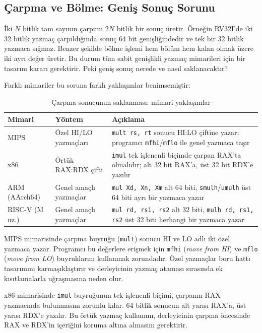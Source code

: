 \subsection{Çarpma ve Bölme: Geniş Sonuç Sorunu}
\label{sec:carpma-bolme-sorunu}

İki $N$ bitlik tam sayının çarpımı $2N$ bitlik bir sonuç üretir. Örneğin RV32I'de iki 32 bitlik yazmaç çarpıldığında sonuç 64 bit genişliğindedir ve tek bir 32 bitlik yazmaca sığmaz. Benzer şekilde bölme işlemi hem bölüm hem kalan olmak üzere iki ayrı değer üretir. Bu durum tüm sabit genişlikli yazmaç mimarileri için bir tasarım kararı gerektirir. Peki geniş sonuç nerede ve nasıl saklanacaktır?

Farklı mimariler bu soruna farklı yaklaşımlar benimsemiştir:

\begin{table}[H]
\centering
\caption{Çarpma sonucunun saklanması: mimari yaklaşımlar}
\label{tab:carpma-saklama}
\small
\begin{tabular}{lp{3.2cm}p{7.5cm}}
\toprule
\textbf{Mimari} & \textbf{Yöntem} & \textbf{Açıklama} \\
\midrule
MIPS & Özel HI/LO yazmaçları & \texttt{mult rs, rt} sonucu HI:LO çiftine yazar; programcı \texttt{mfhi}/\texttt{mflo} ile genel yazmaca taşır \\[3pt]
x86 & Örtük RAX:RDX çifti & \texttt{imul} tek işlenenli biçimde çarpan RAX'ta olmalıdır; alt 32 bit RAX'a, üst 32 bit RDX'e yazılır \\[3pt]
ARM (AArch64) & Genel amaçlı yazmaçlar & \texttt{mul Xd, Xn, Xm} alt 64 biti, \texttt{smulh}/\texttt{umulh} üst 64 biti ayrı bir yazmaca yazar \\[3pt]
RISC-V (M uz.) & Genel amaçlı yazmaçlar & \texttt{mul rd, rs1, rs2} alt 32 biti, \texttt{mulh rd, rs1, rs2} üst 32 biti herhangi bir yazmaca yazar \\
\bottomrule
\end{tabular}
\end{table}

MIPS mimarisinde çarpma buyruğu (\texttt{mult}) sonucu HI ve LO adlı iki özel yazmaca yazar. Programcı bu değerlere erişmek için \texttt{mfhi} (\emph{move from HI}) ve \texttt{mflo} (\emph{move from LO}) buyruklarını kullanmak zorundadır. Özel yazmaçlar boru hattı tasarımını karmaşıklaştırır ve derleyicinin yazmaç ataması sırasında ek kısıtlamalarla uğraşmasına neden olur.

x86 mimarisinde \texttt{imul} buyruğunun tek işlenenli biçimi, çarpanın RAX yazmacında bulunmasını zorunlu kılar. 64 bitlik sonucun alt yarısı RAX'a, üst yarısı RDX'e yazılır. Bu örtük yazmaç kullanımı, derleyicinin çarpma öncesinde RAX ve RDX'in içeriğini koruma altına almasını gerektirir.

